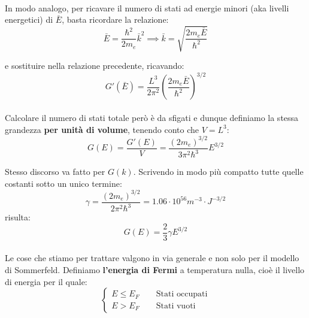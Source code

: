 \documentclass{book}
\begin{document}
            \paragraph{}
                In modo analogo, per ricavare il numero di stati ad energie minori (aka livelli energetici) di $\bar{E}$, basta ricordare la relazione:
                $$\bar{E} = \frac{\hbar ^{2}}{2m_{e}}\bar{k}^{2} \implies \bar{k} =\sqrt{ \frac{2m_{e}\bar{E}}{\hbar ^{2}}}$$

                e sostituire nella relazione precedente, ricavando:
                $$G'(\bar{E}) = \frac{L^{3}}{2 \pi ^{2}} (\frac{2m_{e}\bar{E}}{\hbar ^{2}}) ^{3/2}$$

            \paragraph{}
                Calcolare il numero di stati totale però è da sfigati e dunque definiamo la stessa grandezza \textbf{per unità di volume}, tenendo conto che $V=L^{3}$:
                $$G(E) = \frac{G'(E)}{V} = \frac{(2m_{e}) ^{3/2}}{3 \pi^{2}\hbar^{3}} E^{3/2}$$

                Stesso discorso va fatto per $G(k)$. Scrivendo in modo più compatto tutte quelle costanti sotto un unico termine:
                $$\gamma = \frac{(2m_{e})^{3/2}}{2 \pi^{2} \hbar ^{3}} = 1.06 \cdot 10^{56} m^{-3} \cdot J^{-3/2}$$
                risulta:
                $$G(E) = \frac{2}{3} \gamma E^{3/2}$$

            \paragraph{}
                Le cose che stiamo per trattare valgono in via generale e non solo per il modello di Sommerfeld. Definiamo \textbf{l'energia di Fermi} a temperatura nulla, cioè il livello di energia per il quale:
                $$\begin{cases}
                    E \leq E_{F} \quad \quad \textrm{Stati occupati} \\
                    E> E_{F} \quad \quad \textrm{Stati vuoti}
                \end{cases}$$
                
\end{document}
